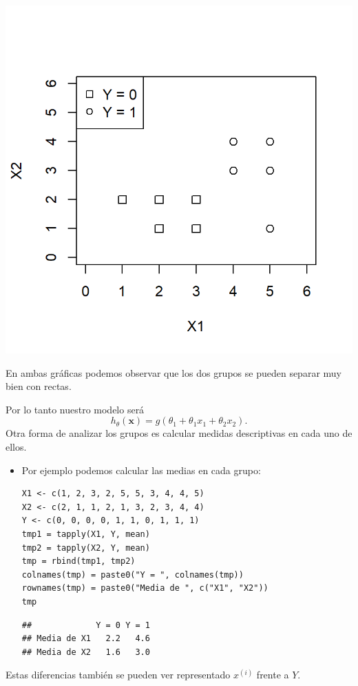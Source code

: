 \begin{minipage}{0.5\textwidth}
\begin{center}
	\includegraphics[width=\linewidth]{"Temas/Imágenes/Tema 3/screenshot004"}
\end{center}
\end{minipage}

En ambas gráficas podemos observar que los dos grupos se pueden separar muy bien con rectas.

Por lo tanto nuestro modelo será \[ h_\theta(\mathbf{x})=g(\theta_1+\theta_1x_1+\theta_2x_2). \]
Otra forma de analizar los grupos es calcular medidas descriptivas en cada uno de ellos.
\begin{itemize}
	\item Por ejemplo podemos calcular las medias en cada grupo:
	\pagebreak
	\begin{lstlisting}
X1 <- c(1, 2, 3, 2, 5, 5, 3, 4, 4, 5)
X2 <- c(2, 1, 1, 2, 1, 3, 2, 3, 4, 4)
Y <- c(0, 0, 0, 0, 1, 1, 0, 1, 1, 1)
tmp1 = tapply(X1, Y, mean)
tmp2 = tapply(X2, Y, mean)
tmp = rbind(tmp1, tmp2)
colnames(tmp) = paste0("Y = ", colnames(tmp))
rownames(tmp) = paste0("Media de ", c("X1", "X2"))
tmp
	\end{lstlisting}
	\begin{verbatim}
##             Y = 0 Y = 1
## Media de X1   2.2   4.6
## Media de X2   1.6   3.0
	\end{verbatim}
\end{itemize}
Estas diferencias también se pueden ver representado $x^{(i)}$ frente a $Y$.


